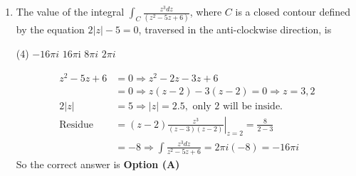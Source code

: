 \begin{note}
\begin{enumerate}[label=\color{ocre}\textbf{\arabic*.}]
	{}
	\begin{tasks}(4)
		\task[\textbf{A.}] $y+x y$
		\task[\textbf{B.}] $x y$
		\task[\textbf{C.}] $y$
		\task[\textbf{D.}] $y^{2}-x^{2}$
	\end{tasks}
	\begin{answer}
		\begin{align*}
		u(x, y)&=x+\frac{1}{2}\left(x^{2}-y^{2}\right), v(x, y)=?\\
		\text{Check }\frac{\partial u}{\partial x}&=\frac{\partial v}{\partial y}\text{ and } \frac{\partial u}{\partial y}=-\frac{\partial v}{\partial x}\\
		\Rightarrow \frac{\partial u}{\partial x}&=\frac{\partial v}{\partial y}, \quad \frac{\partial v}{\partial y}=1+x, \\ v&=y+x y+f(x)\\
		\frac{\partial u}{\partial y}&=-\frac{\partial v}{\partial x} \Rightarrow \frac{\partial v}{\partial x}=+y, \\ v&=y x+f(y)\\
		y+x y+f(x)&=y x+f(y)\\
		\text{If }f(x)&=0\quad \quad
		f(y)=y\\
		v&=x y+y
		\end{align*}
		So the correct answer is \textbf{Option (A)}
	\end{answer}
	\item The value of the integral $\int_{C} \frac{z^{3} d z}{\left(z^{2}-5 z+6\right)}$, where $C$ is a closed contour defined by the equation $2|z|-5=0$, traversed in the anti-clockwise direction, is
	{}
	\begin{tasks}(4)
		\task[\textbf{A.}] $-16 \pi i$
		\task[\textbf{B.}] $16 \pi \mathrm{i}$
		\task[\textbf{C.}] $8 \pi i$
		\task[\textbf{D.}] $2 \pi i$
	\end{tasks}
	\begin{answer}
		\begin{align*}
		z^{2}-5 z+6&=0 \Rightarrow z^{2}-2 z-3 z+6\\&=0 \Rightarrow z(z-2)-3(z-2)=0 \Rightarrow z=3,2\\
		2|z|&=5 \Rightarrow|z|=2.5,\text{ only 2 will be inside.}\\
		\text{Residue }&=\left.(z-2) \frac{z^{3}}{(z-3)(z-2)}\right|_{z=2}=\frac{8}{2-3}\\&=-8 \Rightarrow \int \frac{z^{3} d z}{z^{2}-5 z+6}=2 \pi i(-8)=-16 \pi i
		\end{align*}
		So the correct answer is \textbf{Option (A)}

\end{answer}
\end{enumerate}
\end{note}
